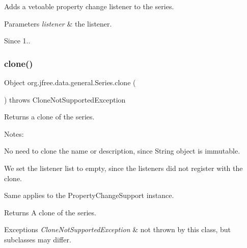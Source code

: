 Adds a vetoable property change listener to the series.


\begin{DoxyParams}{Parameters}
{\em listener} & the listener.\\
\hline
\end{DoxyParams}
\begin{DoxySince}{Since}
1.. 
\end{DoxySince}
\mbox{\label{classorg_1_1jfree_1_1data_1_1general_1_1_series_a8e7f39a9bb93cfd3b3ea180dccab1f35}} 
\subsubsection{\texorpdfstring{clone()}{clone()}}
{\footnotesize\ttfamily Object org.\+jfree.\+data.\+general.\+Series.\+clone (\begin{DoxyParamCaption}{ }\end{DoxyParamCaption}) throws Clone\+Not\+Supported\+Exception}

Returns a clone of the series. 

Notes\+: 
\begin{DoxyItemize}
\item No need to clone the name or description, since String object is immutable. 
\item We set the listener list to empty, since the listeners did not register with the clone. 
\item Same applies to the Property\+Change\+Support instance. 
\end{DoxyItemize}

\begin{DoxyReturn}{Returns}
A clone of the series.
\end{DoxyReturn}

\begin{DoxyExceptions}{Exceptions}
{\em Clone\+Not\+Supported\+Exception} & not thrown by this class, but subclasses may differ. \\
\hline
\end{DoxyExceptions}
\mbox{\label{classorg_1_1jfree_1_1data_1_1general_1_1_series_a38ea4fb648966bd788681aee965b3311}} 
